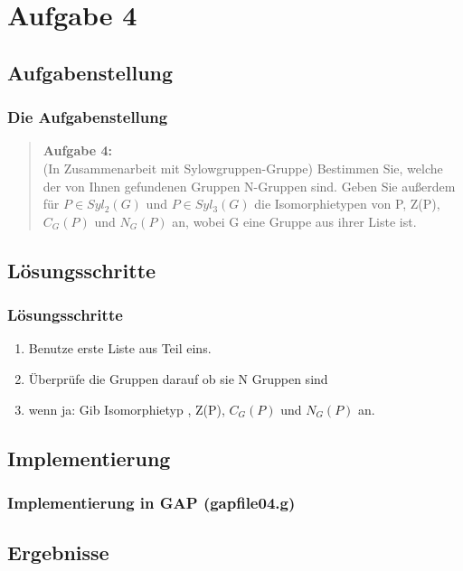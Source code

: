 \documentclass{beamer}
\begin{document}
\section{Aufgabe 4}
\subsection{Aufgabenstellung}

\begin{frame}
	\frametitle{Die Aufgabenstellung}
	\begin{quote}
	\textbf{Aufgabe 4:}\\
	(In Zusammenarbeit mit Sylowgruppen-Gruppe) Bestimmen Sie, welche der von Ihnen gefundenen Gruppen N-Gruppen sind. Geben Sie außerdem für 
	$ P \in Syl_2(G) $ und $ P \in Syl_3(G) $ die Isomorphietypen von P, Z(P), $ C_G(P) $ und $ N_G(P) $ an, wobei G eine Gruppe aus ihrer Liste ist.
	\end{quote}
\end{frame}
\subsection{Lösungsschritte}

\begin{frame}
	\frametitle{Lösungsschritte}
	\begin{enumerate}
	 \item Benutze erste Liste aus Teil eins.
	 \item Überprüfe die Gruppen darauf ob sie N Gruppen sind
	 \item wenn ja: Gib Isomorphietyp , Z(P), $ C_G(P) $ und $ N_G(P) $ an. 		 
	\end{enumerate}
\end{frame}
\subsection{Implementierung}

\begin{frame}
	\frametitle{Implementierung in GAP (gapfile04.g)}
	\begin{quote}
	 
		 
	\end{quote}
\end{frame}
\subsection{Ergebnisse}
\end{document}
